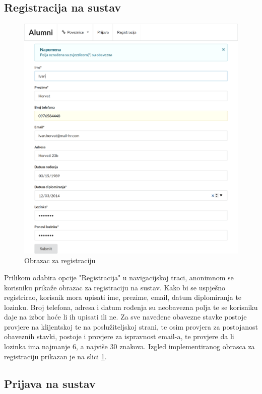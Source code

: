\documentclass[zavrsni, numeric]{fer}
\begin{document}
\subsection{Registracija na sustav}

\begin{figure}[H]
	\centering
	\includegraphics[width=13cm]{slike/registracija.png}
	\caption{Obrazac za registraciju}
	\label{fig:registracija}
\end{figure}

Prilikom odabira opcije "Registracija" u navigacijskoj traci, anonimnom se korisniku prikaže obrazac za registraciju na sustav. Kako bi se uspješno registrirao, korisnik mora upisati ime, prezime, email, datum diplomiranja te lozinku. Broj telefona, adresa i datum rođenja su neobavezna polja te se korisniku daje na izbor hoće li ih upisati ili ne. Za sve navedene obavezne stavke postoje provjere na klijentskoj te na poslužiteljskoj strani, te osim provjera za postojanost obaveznih stavki, postoje i provjere za ispravnost email-a, te provjere da li lozinka ima najmanje 6, a najviše 30 znakova. Izgled implementiranog obrasca za registraciju prikazan je na slici \ref{fig:registracija}.

\subsection{Prijava na sustav}
\end{document}
